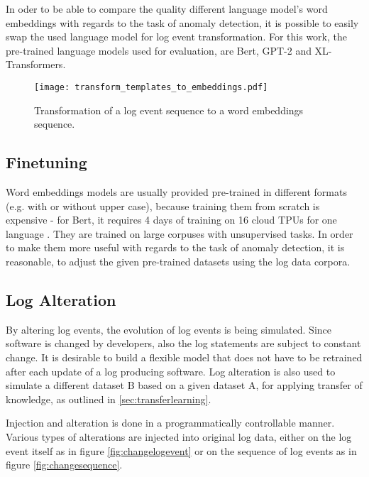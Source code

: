In oder to be able to compare the quality different language model's word embeddings with regards to the task of anomaly detection, it is possible to easily swap the used language model for log event transformation. For this work, the pre-trained language models used for evaluation, are Bert, GPT-2 and XL-Transformers. 


\begin{figure}[H]
	\centering
	\texttt{[image: transform\_templates\_to\_embeddings.pdf]}
	\caption{Transformation of a log event sequence to a word embeddings sequence.}
	\label{fig:transform_sequence_to_embeddings}
\end{figure}



\subsection{Finetuning\label{sec:finetuning}}
Word embeddings models are usually provided pre-trained in different formats (e.g. with or without upper case), because training them from scratch is expensive - for Bert, it requires 4 days of training on 16 cloud TPUs for one language \cite{googlebert}. They are trained on large corpuses with unsupervised tasks. In order to make them more useful with regards to the task of anomaly detection, it is reasonable, to adjust the given pre-trained datasets using the log data corpora.

\subsection{Log Alteration\label{sec:logs_alteration}}
By altering log events, the evolution of log events is being simulated. Since software is changed by developers, also the log statements are subject to constant change. It is desirable to build a flexible model that does not have to be retrained after each update of a log producing software. Log alteration is also used to simulate a different dataset B based on a given dataset A, for applying transfer of knowledge, as outlined in \ref{sec:transferlearning}.

Injection and alteration is done in a programmatically controllable manner. Various types of alterations are injected into original log data, either on the log event itself as in figure \ref{fig:changelogevent} or on the sequence of log events as in figure \ref{fig:changesequence}.

